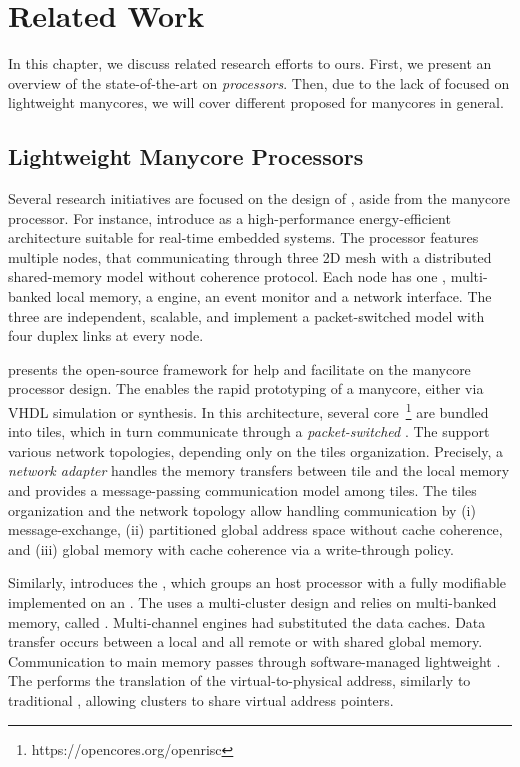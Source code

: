 \chapter{Related Work}
\label{ch.related-work}

In this chapter, we discuss related research efforts to ours.
First, we present an overview of the state-of-the-art on
\textit{\lightweight \manycore processors}. Then, due to the
lack of \oss focused on lightweight manycores, we will cover
different proposed \oss for manycores in general.

\section{Lightweight Manycore Processors}
\label{sec.works.manycores}

	Several research initiatives are focused on the design of
	\lightweight \manycores, aside from the \mppa \lightweight manycore
	processor.  For instance,  introduce
	\epiphany as a high-performance energy-efficient \manycore
	architecture suitable for real-time embedded systems.  The
	processor features multiple nodes, that communicating through three 2D mesh
	\nocs with a distributed shared-memory model without coherence
	protocol.  Each node has one \risc \cpu, multi-banked local memory,
	a \dma engine, an event monitor and a network interface.  The three
	\nocs are independent, scalable, and implement a packet-switched
	model with four duplex links at every node.

	 presents the open-source \optimsoc framework
	for help and facilitate on the manycore processor design. The \optimsoc
	enables the rapid prototyping of a manycore, either via VHDL
	simulation or \fpga synthesis.
	In this architecture, several \openrisc
	core~\footnote{https://opencores.org/openrisc} are bundled into
	tiles, which in turn communicate through a \textit{packet-switched \noc}.
	The \noc support various network topologies, depending only on the tiles organization.
	Precisely, a \textit{network adapter} handles the memory transfers between
	tile and the local memory and provides a message-passing communication
	model among tiles.
	The tiles organization and the network topology allow handling
	communication by (i) message-exchange, (ii) partitioned global
	address space without cache coherence, and (iii) global memory
	with cache coherence via a write-through policy.

	Similarly,  introduces the \hero, which
	groups an \arm host processor with a fully modifiable
	\riscv \manycore implemented on an \fpga. The \pmca uses a
	multi-cluster design and relies on multi-banked memory, called \spm.
	Multi-channel \dma engines had substituted the data caches.
	Data transfer occurs between a local \spm and all remote \spms or
	with shared global memory. Communication to main memory passes
	through software-managed lightweight \rab. The \rab performs the
	translation of the virtual-to-physical address, similarly to
	traditional \mmu, allowing clusters to share virtual address pointers.


